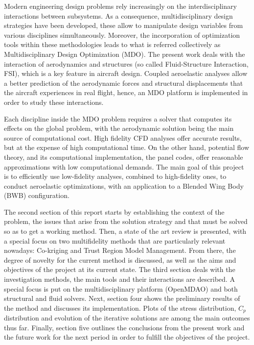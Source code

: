 Modern engineering design problems rely increasingly on the interdisciplinary interactions between subsystems. As a consequence, multidisciplinary design strategies have been developed, these allow to manipulate design variables from various disciplines simultaneously. Moreover, the incorporation of optimization tools within these methodologies leads to what is referred collectively as Multidisciplinary Design Optimization (MDO).    
The present work deals with the interaction of aerodynamics and structures (so called Fluid-Structure Interaction, FSI), which is a key feature in aircraft design. Coupled aeroelastic analyses allow a better prediction of the aerodynamic forces and structural displacements that the aircraft experiences in real flight, hence, an MDO platform is implemented in order to study these interactions. \par 
Each discipline inside the MDO problem requires a solver that computes its effects on the global problem, with the aerodynamic solution being the main source of computational cost. High fidelity CFD analyses offer accurate results, but at the expense of high computational time. On the other hand, potential flow theory, and its computational implementation, the panel codes, offer reasonable approximations with low computational demands. The main goal of this project is to efficiently use low-fidelity analyses, combined to high-fidelity ones, to conduct aeroelastic optimizations, with an application to a Blended Wing Body (BWB) configuration. \par
The second section of this report starts by establishing the context of the problem, the issues that arise from the solution strategy and that must be solved so as to get a working method. Then, a state of the art review is presented, with a special focus on two multifidelity methods that are particularly relevant nowadays: Co-kriging and Trust Region Model Management. From there, the degree of novelty for the current method is discussed, as well as the aims and objectives of the project at its current state. The third section deals with the investigation methods, the main tools and their interactions are described. A special focus is put on the multidisciplinary platform (OpenMDAO) and both structural and fluid solvers. Next, section four shows the preliminary results of the method and discusses its implementation. Plots of the stress distribution, $C_p$ distribution and evolution of the iterative solutions are among the main outcomes thus far.  Finally, section five outlines the conclusions from the present work and the future work for the next period in order to fulfill the objectives of the project. 

